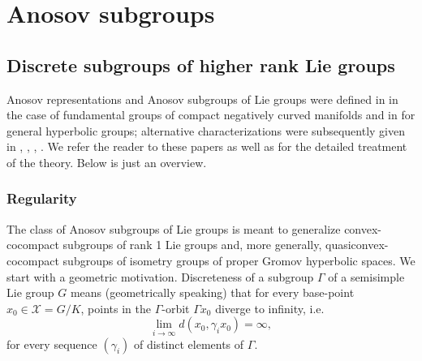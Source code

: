 \documentclass[12pt]{amsbook}%
\theoremstyle{definition}
\theoremstyle{remark}
\numberwithin{section}{chapter}
\numberwithin{subsection}{section}
\numberwithin{figure}{chapter}
\def\cX{{\mathscr{X}}}
\def\Ga{\Gamma}
\def\ga{\gamma}
\begin{document}
{{\chapter{Anosov subgroups}\label{sec:Anosov}





\section{Discrete subgroups of higher rank Lie groups}\label{sec:def anosov}

Ano\-sov representations and Anosov subgroups of Lie groups were defined in \cite{Labourie} in the case of fundamental groups of compact negatively curved manifolds and in \cite{Guichard-Wienhard} for general hyperbolic groups; alternative characterizations were subsequently given  in \cite{KLP14}, \cite{KLP17}, \cite{KLP18}, \cite{Kapovich-Leeb-finsler}. We refer the reader to these papers as well as \cite{manicures} for the detailed treatment of the theory. Below is just an overview. 

\subsection{Regularity}


The class of Anosov subgroups of Lie groups is meant to generalize convex-cocompact subgroups of rank 1 Lie groups and, more generally, 
quasiconvex-cocompact subgroups of isometry groups of proper Gro\-mov hyperbolic spaces. We start with a geometric motivation. Discreteness of a subgroup $\Ga$ of a semisimple Lie group $G$ means (geometrically speaking) that for every base-point $x_0\in \cX=G/K$, points in the $\Ga$-orbit $\Ga x_0$ diverge to infinity, i.e.
$$
\lim_{i\to\infty} d(x_0, \ga_i x_0)=\infty,
$$
for every sequence $(\ga_i)$ of distinct elements of $\Ga$. 




}}
\end{document}

